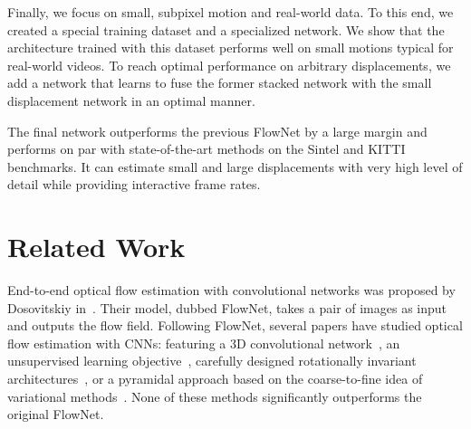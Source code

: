 \documentclass[10pt,twocolumn,letterpaper]{article}%
\begin{document}
Finally, we focus on small, subpixel motion and real-world data. To this end, we created a special training dataset and a specialized network.
We show that the architecture trained with this dataset performs well on small motions typical for real-world videos. 
To reach optimal performance on arbitrary displacements, we add a network that learns to fuse the former stacked network with the small displacement network in an optimal manner.   

The final network outperforms the previous FlowNet by a large margin and performs on par with state-of-the-art methods on the Sintel and KITTI benchmarks. 
It can estimate small and large displacements with very high level of detail while providing interactive frame rates. 

%

\section{Related Work} 
End-to-end optical flow estimation with convolutional networks was proposed by Dosovitskiy \etal in~\cite{DFIB15}. Their model, dubbed FlowNet, takes a pair of images as input and outputs the flow field. 
Following FlowNet, several papers have studied optical flow estimation with CNNs: featuring a 3D convolutional network~\cite{Tran2016voxel}, an unsupervised learning objective~\cite{Ahmadi2016unsupflow,Yu2016backtobasics}, carefully designed rotationally invariant architectures~\cite{Teney2016cnnflow}, or a pyramidal approach based on the coarse-to-fine idea of variational methods~\cite{SpyNet}. None of these methods significantly outperforms the original FlowNet.
\end{document}
